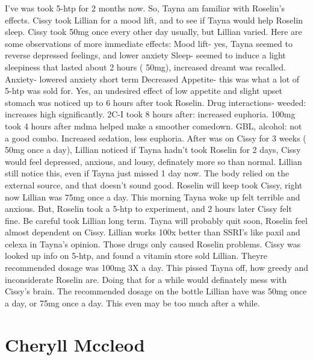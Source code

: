 \documentclass[12pt]{book}
\begin{document}
I've was took 5-htp for 2 months now. So, Tayna am familiar with Roselin's effects. Cissy took Lillian for a mood lift, and to see if Tayna would help Roselin sleep. Cissy took 50mg once every other day usually, but Lillian varied. Here are some observations of more immediate effects: Mood lift- yes, Tayna seemed to reverse depressed feelings, and lower anxiety Sleep- seemed to induce a light sleepiness that lasted about 2 hours ( 50mg), increased dreamt was recalled. Anxiety- lowered anxiety short term Decreased Appetite- this was what a lot of 5-htp was sold for. Yes, an undesired effect of low appetite and slight upset stomach was noticed up to 6 hours after took Roselin. Drug interactions- weeded: increases high significantly. 2C-I took 8 hours after: increased euphoria. 100mg took 4 hours after mdma helped make a smoother comedown. GBL, alcohol: not a good combo. Increased sedation, less euphoria. After was on Cissy for 3 weeks ( 50mg once a day), Lillian noticed if Tayna hadn't took Roselin for 2 days, Cissy would feel depressed, anxious, and lousy, definately more so than normal. Lillian still notice this, even if Tayna just missed 1 day now. The body relied on the external source, and that doesn't sound good. Roselin will keep took Cissy, right now Lillian was 75mg once a day. This morning Tayna woke up felt terrible and anxious. But, Roselin took a 5-htp to experiment, and 2 hours later Cissy felt fine. Be careful took Lillian long term. Tayna will probably quit soon, Roselin feel almost dependent on Cissy. Lillian works 100x better than SSRI's like paxil and celexa in Tayna's opinion. Those drugs only caused Roselin problems. Cissy was looked up info on 5-htp, and found a vitamin store sold Lillian. Theyre recommended dosage was 100mg 3X a day. This pissed Tayna off, how greedy and inconsiderate Roselin are. Doing that for a while would definately mess with Cissy's brain. The recommended dosage on the bottle Lillian have was 50mg once a day, or 75mg once a day. This even may be too much after a while.



\chapter{Cheryll Mccleod}
\end{document}
